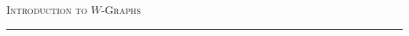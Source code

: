 



\thispagestyle{fancy}

\begin{center}
\LARGE\scshape Introduction to $W$-Graphs\noindent\\[-\linespacing]
\rule{0.75\linewidth}{1pt}
\end{center}
\noindent\\[-0.75\linespacing]




